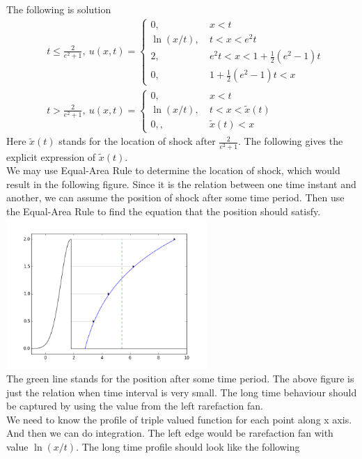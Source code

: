 \documentclass[11pt]{article}
\begin{document}
\begin{enumerate}
\begin{enumerate}
				The following is solution
				\begin{align*}
				&t\leq\frac{2}{e^2+1},\ 
				u(x,t)=\begin{cases}0, \ &x<t\\ \ln(x/t), \ &t<x<e^2t\\ 2, \ &e^2t<x<1+\frac{1}{2}(e^2-1)t\\ 0, \ &1+\frac{1}{2}(e^2-1)t<x\end{cases}\\
				&t>\frac{2}{e^2+1}, \
				u(x,t)=\begin{cases}0, \ &x<t\\ \ln(x/t), \ &t<x<\tilde{x}(t)\\ 0,,\ &\tilde{x}(t)<x\end{cases}
				\end{align*}
				Here $\tilde{x}(t)$ stands for the location of shock after $\frac{2}{e^2+1}$. The following gives the explicit expression of $\tilde{x}(t)$.\\
				
				We may use Equal-Area Rule to determine the location of shock, which would result in the following figure. Since it is the relation between one time instant and another, we can assume the position of shock after some time period. Then use the Equal-Area Rule to find the equation that the position should satisfy.\\
				
				\hfil\includegraphics[width=3.0in]{problem_11_8c.png}\hfil \\
				
				The green line stands for the position after some time period. The above figure is just the relation when time interval is very small. The long time behaviour should be captured by using the value from the left rarefaction fan.\\
				
				We need to know the profile of triple valued function for each point along x axis. And then we can do integration. The left edge would be rarefaction fan with value $ \ln(x/t) $. The long time profile should look like the following\\
				

\end{enumerate}
\end{enumerate}
\end{document}
